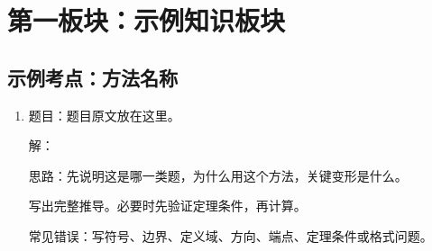 \section{第一板块：示例知识板块}

\subsection{示例考点：方法名称}

\begin{enumerate}
  \item {}

  题目：题目原文放在这里。

  解：

  \begin{ideabox}
  思路：先说明这是哪一类题，为什么用这个方法，关键变形是什么。
  \end{ideabox}

  写出完整推导。必要时先验证定理条件，再计算。


  \begin{pitfallbox}
  常见错误：写符号、边界、定义域、方向、端点、定理条件或格式问题。
  \end{pitfallbox}
\end{enumerate}
